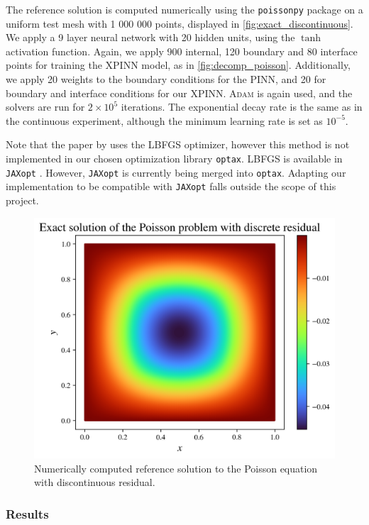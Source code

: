 The reference solution is computed numerically using the \verb|poissonpy| package \cite{poissonpy} on a uniform test mesh with 1 000 000 points, displayed in \autoref{fig:exact_discontinuous}.
We apply a 9 layer neural network with 20 hidden units, using the $\tanh$ activation function.
Again, we apply 900 internal, 120 boundary and 80 interface points for training the XPINN model, as in \autoref{fig:decomp_poisson}.
Additionally, we apply 20 weights to the boundary conditions for the PINN, and 20 for boundary and interface conditions for our XPINN. 
\textsc{Adam} is again used, and the solvers are run for $2\times 10^5$ iterations. The exponential decay rate is the same as in the continuous experiment, although the minimum learning rate is set as $10^{-5}$.

Note that the paper by \textcite{XPINN_generalize} uses the LBFGS optimizer, however this method is not implemented in our chosen optimization library \verb|optax|.
LBFGS is available in \verb|JAXopt| \cite{jaxopt_implicit_diff}.
However, \verb|JAXopt| is currently being merged into \verb|optax|.
Adapting our implementation to be compatible with \verb|JAXopt| falls outside the scope of this project.

\begin{figure}[!h]
    \centering
    \includegraphics[width = 0.8\linewidth]{Project1XPINNs/figures/Poisson/discrete_Poisson_solution.png}
    \caption{Numerically computed reference solution to the Poisson equation with discontinuous residual.}
    \label{fig:exact_discontinuous}
\end{figure}

\subsubsection{Results}
